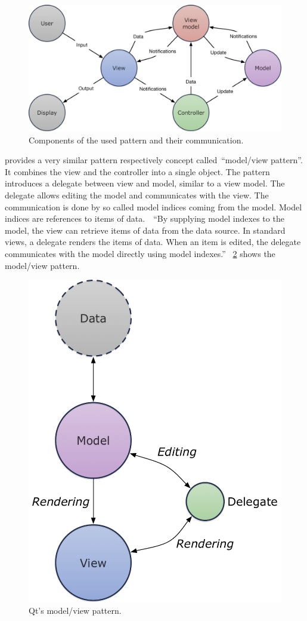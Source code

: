 \documentclass[%
    a4paper,    %
    justified,  %
    nobib,      %
    openany     %
]{tufte-book}
\begin{document}
\begin{figure}[ht]
  \includegraphics[width=0.8\linewidth]{images/mvvmc}
  \caption{Components of the used pattern and their communication.}
  \label{fig:software-design-pattern-components}
\end{figure}

 provides a very similar pattern respectively
concept called~\enquote{model/view pattern}. It combines the view and the
controller into a single object. The pattern introduces a delegate between view
and model, similar to a view model. The delegate allows editing the model and
communicates with the view. The communication is done by so called model indices
coming from the model. Model indices are references to items of
data.~\cite{qt-mvp-2017}~\enquote{By supplying model indexes to the model, the
view can retrieve items of data from the data source. In standard views, a
delegate renders the items of data. When an item is edited, the delegate
communicates with the model directly using model indexes.}~\cite{qt-mvp-2017}
\cref{fig:software-design-pattern-qt-mvp} shows the model/view pattern.

\begin{figure}[ht]
  \includegraphics[width=0.6\linewidth]{images/model-view-pattern}
  \caption{Qt's model/view pattern.~\cite{qt-mvp-2017}}
  \label{fig:software-design-pattern-qt-mvp}
\end{figure}
\end{document}
